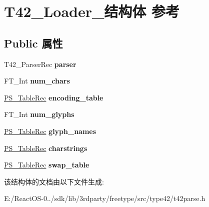 \hypertarget{struct_t42___loader__}{}\section{T42\+\_\+\+Loader\+\_\+结构体 参考}
\label{struct_t42___loader__}
\subsection*{Public 属性}
\begin{DoxyCompactItemize}
\item 
\mbox{\label{struct_t42___loader___a7cbb8dec01fe34df610f485a8c7acdb2}} 
T42\+\_\+\+Parser\+Rec {\bfseries parser}
\item 
\mbox{\label{struct_t42___loader___a4081336233d57e0e2503b923855df27f}} 
F\+T\+\_\+\+Int {\bfseries num\+\_\+chars}
\item 
\mbox{\label{struct_t42___loader___a334e079aec27c48a96d39b3c9ba8f572}} 
\hyperlink{struct_p_s___table_rec__}{P\+S\+\_\+\+Table\+Rec} {\bfseries encoding\+\_\+table}
\item 
\mbox{\label{struct_t42___loader___af3f27a6420c89477ac605d7ad92c9da0}} 
F\+T\+\_\+\+Int {\bfseries num\+\_\+glyphs}
\item 
\mbox{\label{struct_t42___loader___a6e75eaf87cb8d0381b906669872926b3}} 
\hyperlink{struct_p_s___table_rec__}{P\+S\+\_\+\+Table\+Rec} {\bfseries glyph\+\_\+names}
\item 
\mbox{\label{struct_t42___loader___a950fab436437a128eda5cd5b0757962a}} 
\hyperlink{struct_p_s___table_rec__}{P\+S\+\_\+\+Table\+Rec} {\bfseries charstrings}
\item 
\mbox{\label{struct_t42___loader___ad4c14723ea9033b9e296482bfbc5d71e}} 
\hyperlink{struct_p_s___table_rec__}{P\+S\+\_\+\+Table\+Rec} {\bfseries swap\+\_\+table}
\end{DoxyCompactItemize}


该结构体的文档由以下文件生成\+:\begin{DoxyCompactItemize}
\item 
E\+:/\+React\+O\+S-\/0../sdk/lib/3rdparty/freetype/src/type42/t42parse.\+h\end{DoxyCompactItemize}
